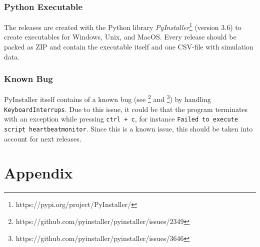 \documentclass[a4paper]{article}
\begin{document}
\subsubsection{Python Executable}
The releases are created with the Python library \textit{PyInstaller}\footnote{https://pypi.org/project/PyInstaller/} (version 3.6) to create executables for Windows, Unix, and MacOS. Every release should be packed as ZIP and contain the executable itself and one CSV-file with simulation data.
\subsubsection*{Known Bug}
PyInstaller itself contains of a known bug (see \footnote{https://github.com/pyinstaller/pyinstaller/issues/2349} and \footnote{https://github.com/pyinstaller/pyinstaller/issues/3646}) by handling \texttt{KeyboardInterrups}. Due to this issue, it could be that the program terminates with an exception while pressing \texttt{ctrl + c}, for instance \texttt{Failed to execute script heartbeatmonitor}. Since this is a known issue, this should be taken into account for next releases.

\clearpage
\section{Appendix}
\end{document}
